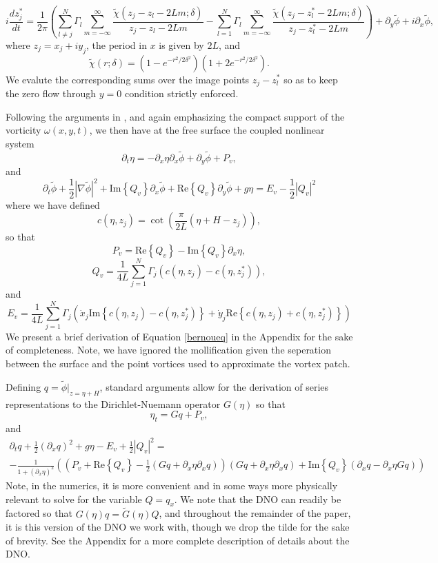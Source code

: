 \documentclass[a4paper,11pt]{article}
\newcommand{\p}{\partial}
\begin{document}
\[
i\frac{d z^{\ast}_{j}}{dt}  = \frac{1}{2\pi}\left(\sum_{l\neq j}^{N} \Gamma_{l} \sum_{m=-\infty}^{\infty} \frac{\tilde{\chi}(z_{j}-z_{l}-2Lm;\delta)}{z_{j}-z_{l}-2Lm} -   \sum_{l=1}^{N} \Gamma_{l} \sum_{m=-\infty}^{\infty} \frac{\tilde{\chi}(z_{j}-z^{\ast}_{l}-2Lm;\delta)}{z_{j}-z^{\ast}_{l}-2Lm}\right)  + \p_{y}\tilde{\phi} + i\p_{x}\tilde{\phi}, 
\]
where $z_{j}=x_{j} + iy_{j}$, the period in $x$ is given by $2L$, and
\[
\tilde{\chi}(r;\delta) = \left(1-e^{-r^{2}/2\delta^{2}} \right)\left(1+2e^{-r^{2}/2\delta^{2}} \right).
\]
We evalute the corresponding sums over the image points $z_{j}-z_{l}^{\ast}$ so as to keep the zero flow through $y=0$ condition strictly enforced.  

Following the arguments in \cite{curtis}, and again emphasizing the compact support of the vorticity $\omega(x,y,t)$, we then have at the free surface the coupled nonlinear system
\[
\p_{t}\eta = -\p_{x}\eta\p_{x}\tilde{\phi} + \p_{y}\tilde{\phi} + P_{v},
\]
and
\begin{equation}
\p_{t}\tilde{\phi} + \frac{1}{2}\left|\nabla \tilde{\phi}\right|^{2} +\mbox{Im}\left\{Q_{v}\right\}\p_{x}\tilde{\phi} + \mbox{Re}\left\{Q_{v}\right\}\p_{y}\tilde{\phi} + g\eta = E_{v} - \frac{1}{2}\left|Q_{v}\right|^{2} 
\label{bernoueq}
\end{equation}
where we have defined
\[
c(\eta,z_{j}) = \cot\left(\frac{\pi}{2L}\left(\eta+H-z_{j}\right)\right),
\]
so that 
\[
P_{v} = \mbox{Re}\left\{Q_{v}\right\} - \mbox{Im}\left\{Q_{v}\right\}\p_{x}\eta , 
\]
\[
Q_{v} = \frac{1}{4L}\sum_{j=1}^{N}\Gamma_{j}\left(c(\eta,z_{j}) - c(\eta,z^{\ast}_{j})\right),
\]
and
\[
E_{v} = \frac{1}{4L}\sum_{j=1}^{N}\Gamma_{j}\left(\dot{x}_{j}\mbox{Im}\left\{c(\eta,z_{j})-c(\eta,z^{\ast}_{j})\right\} + \dot{y}_{j}\mbox{Re}\left\{c(\eta,z_{j})+c(\eta,z^{\ast}_{j})\right\}\right)
\]
We present a brief derivation of Equation \eqref{bernoueq} in the Appendix for the sake of completeness.  Note, we have ignored the mollification given the seperation between the surface and the point vortices used to approximate the vortex patch.  

Defining $q = \tilde{\phi}|_{z=\eta+H}$, standard arguments \cite{craig,curtis} allow for the derivation of series representations to the Dirichlet-Nuemann operator $G(\eta)$ so that 
\[
\eta_{t} = Gq + P_{v},
\]
and 
\begin{multline*}
\p_{t}q + \frac{1}{2}\left(\p_{x}q\right)^{2} + g\eta - E_{v} + \frac{1}{2}\left|Q_{v}\right|^{2} =\\
- \frac{1}{1+(\p_{x}\eta)^{2}}\left(\left(P_{v}+\mbox{Re}\left\{Q_{v}\right\}-\frac{1}{2}\left(Gq+\p_{x}\eta\p_{x}q\right)\right)\left(Gq+\p_{x}\eta\p_{x}q\right) + \mbox{Im}\left\{Q_{v}\right\}(\p_{x}q - \p_{x}\eta Gq) \right) 
\end{multline*}
Note, in the numerics, it is more convenient and in some ways more physically relevant to solve for the variable $Q=q_{x}$.  We note that the DNO can readily be factored so that $G(\eta)q = \tilde{G}(\eta)Q$, and throughout the remainder of the paper, it is this version of the DNO we work with, though we drop the tilde for the sake of brevity.  See the Appendix for a more complete description of details about the DNO.  
\end{document}
